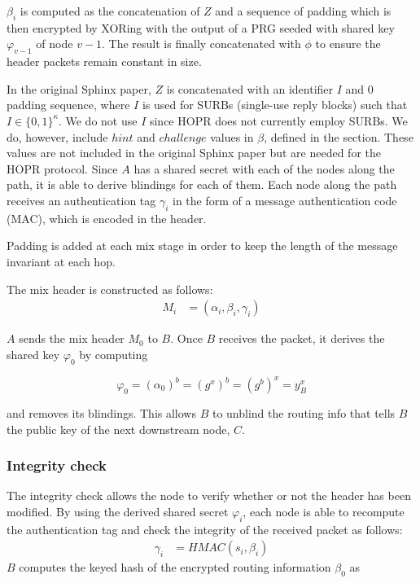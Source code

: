 $\beta_i$ is computed as the concatenation of $Z$ and a sequence of padding which is then encrypted by XORing with the output of a PRG seeded with shared key $\varphi_{v-1}$ of node $v-1$. The result is finally concatenated with $\phi$ to ensure the header packets remain constant in size.
    
In the original Sphinx paper, $Z$ is concatenated with an identifier $I$ and $0$ padding sequence, where $I$ is used for SURBs (single-use reply blocks) such that $I \in \{0, 1\}^\kappa$. We do not use $I$ since HOPR does not currently employ SURBs. We do, however, include $hint$ and $challenge$ values in $\beta$, defined in the  section. These values are not included in the original Sphinx paper but are needed for the HOPR protocol. Since $A$ has a shared secret with each of the nodes along the path, it is able to derive blindings for each of them. Each node along the path receives an authentication tag $\gamma_i$ in the form of a message authentication code (MAC), which is encoded in the header.

Padding is added at each mix stage in order to keep the length of the message invariant at each hop.

The mix header is constructed as follows: 
\begin{align}  
    M_i&=(\alpha_i,\beta_i,\gamma_i)
\end{align}

$A$ sends the mix header $M_0$ to $B$. Once $B$ receives the packet, it derives the shared key $\varphi_0$ by computing

$$\varphi_0=(\alpha_0)^b=(g^x)^b=(g^b)^x=y^x_B$$

and removes its blindings. This allows $B$ to unblind the routing info that tells $B$ the public key of the next downstream node, $C$.

\subsubsection{Integrity check}
The integrity check allows the node to verify whether or not the header has been modified. By using the derived shared secret $\varphi_i$, each node is able to recompute the authentication tag and check the integrity of the received packet as follows: 
\begin{align}  
    \gamma_i&=HMAC(s_i,\beta_i)
    \label{eq:6}
\end{align}
$B$ computes the keyed hash of the encrypted routing information $\beta_0$ as

